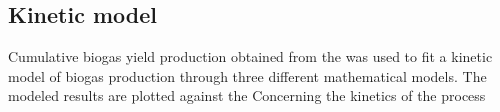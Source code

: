 \subsection{Kinetic model}
Cumulative biogas yield production obtained from the  was used to fit a kinetic model of biogas production through three different mathematical models. The modeled results are plotted against the
Concerning the kinetics of the process